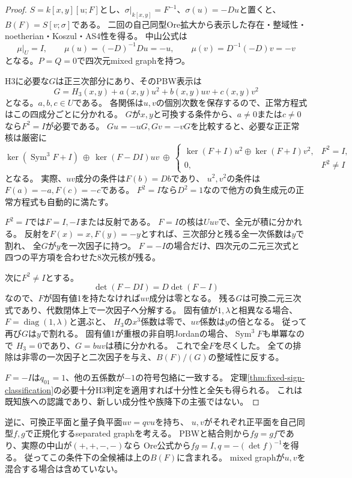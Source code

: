 \begin{proof}
$S=k[x,y][u;F]$とし、$\sigma|_{k[x,y]}=F^{-1}$、$\sigma(u)=-Du$と置くと、
$B(F)=S[v;\sigma]$である。
二回の自己同型Ore拡大から表示した存在・整域性・noetherian・Koszul・AS4性を得る。
中山公式は
\[
 \mu|_U=I,\qquad\mu(u)=(-D)^{-1}D u=-u,\qquad
 \mu(v)=D^{-1}(-D)v=-v
\]
となる。$P=Q=0$で四次元mixed graphを持つ。

H3に必要な$G$は正三次部分にあり、そのPBW表示は
\[
 G=H_3(x,y)+a(x,y)u^2+b(x,y)uv+c(x,y)v^2
\]
となる。$a,b,c\in U$である。
各関係は$u,v$の個別次数を保存するので、正常方程式はこの四成分ごとに分かれる。
$G$が$x,y$と可換する条件から、$a\ne0$または$c\ne0$なら$F^2=I$が必要である。
$Gu=-uG,Gv=-vG$を比較すると、必要な正正常核は厳密に
\[
 \ker(\operatorname{Sym}^3F+I)
 \ \oplus\ \ker(F-DI)uv
 \ \oplus\
 \begin{cases}
  \ker(F+I)u^2\oplus\ker(F+I)v^2,&F^2=I,\\
  0,&F^2\ne I
 \end{cases}
\]
となる。
実際、$uv$成分の条件は$F(b)=Db$であり、
$u^2,v^2$の条件は$F(a)=-a,F(c)=-c$である。
$F^2=I$なら$D^2=1$なので他方の負生成元の正常方程式も自動的に満たす。

$F^2=I$では$F=I,-I$または反射である。
$F=I$の核は$Uuv$で、全元が積に分かれる。
反射を$F(x)=x,F(y)=-y$とすれば、三次部分と残る全一次係数は$y$で割れ、
全$G$が$y$を一次因子に持つ。
$F=-I$の場合だけ、四次元の二元三次式と四つの平方項を合わせた8次元核が残る。

次に$F^2\ne I$とする。
\[
 \det(F-DI)=D\det(F-I)
\]
なので、$F$が固有値1を持たなければ$uv$成分は零となる。
残る$G$は可換二元三次式であり、代数閉体上で一次因子へ分解する。
固有値が$1,\lambda$と相異なる場合、$F=\operatorname{diag}(1,\lambda)$と選ぶと、
$H_3$の$x^3$係数は零で、$uv$係数は$y$の倍となる。
従って再び$G$は$y$で割れる。
固有値1が重根の非自明Jordanの場合、$\operatorname{Sym}^3F$も単冪なので
$H_3=0$であり、$G=buv$は積に分かれる。
これで全$F$を尽くした。
全ての排除は非零の一次因子と二次因子を与え、$B(F)/(G)$の整域性に反する。

$F=-I$は$q_{01}=1$、他の五係数が$-1$の符号包絡に一致する。
定理\ref{thm:fixed-sign-classification}の必要十分H3判定を適用すれば十分性と全矢も得られる。
これは既知族への認識であり、新しい成分性や族降下の主張ではない。
\end{proof}

逆に、可換正平面と量子負平面$uv=qvu$を持ち、
$u,v$がそれぞれ正平面を自己同型$f,g$で正規化するseparated graphを考える。
PBWと結合則から$fg=gf$であり、実際の中山が$(+,+,-,-)$なら
Ore公式から$fg=I,q=-(\det f)^{-1}$を得る。
従ってこの条件下の全候補は上の$B(F)$に含まれる。
mixed graphが$u,v$を混合する場合は含めていない。

